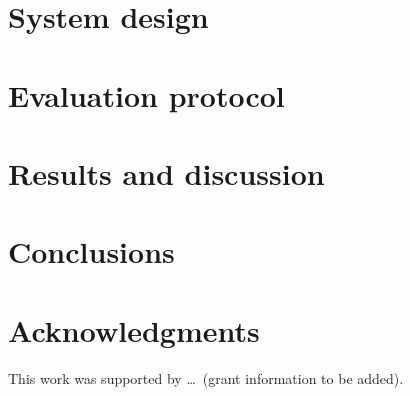 \documentclass[preprint,12pt,authoryear]{elsarticle}
\begin{document}
\section{System design}
\label{sec:system}


\section{Evaluation protocol}
\label{sec:eval}


\section{Results and discussion}
\label{sec:results}


\section{Conclusions}
\label{sec:concl}


\section*{Acknowledgments}
This work was supported by \ldots\ (grant information to be added).



\end{document}
